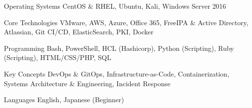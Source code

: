 


\begin{cvskills}


\cvskill
{Operating Systems} %
{CentOS \& RHEL, Ubuntu,  Kali, Windows Server 2016} %


\cvskill
{Core Technologies} %
{VMware, AWS, Azure, Office 365, FreeIPA \& Active Directory, Atlassian, Git CI/CD, ElasticSearch, PKI, Docker} %


\cvskill
{Programming} %
{Bash, PowerShell,  HCL (Hashicorp), Python (Scripting), Ruby (Scripting), HTML/CSS/PHP, SQL} %


\cvskill
{Key Concepts} %
{DevOps \& GitOps, Infrastructure-as-Code, Containerization, Systems Architecture \& Engineering, Incident Response} %


\cvskill
{Languages} %
{English, Japanese (Beginner)} %


\end{cvskills}